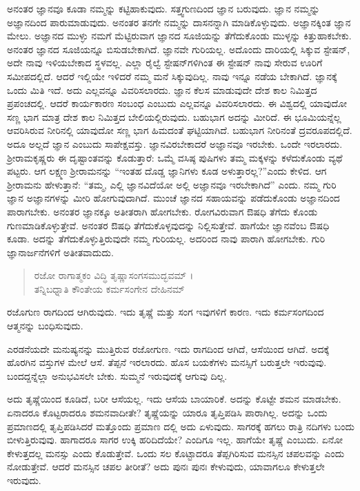 ಅನಂತರ ಜ್ಞಾನವೂ ಕೂಡಾ ನಮ್ಮನ್ನು ಕಟ್ಟಿಹಾಕುವುದು. ಸತ್ತ್ವಗುಣದಿಂದ ಜ್ಞಾನ ಬರುವುದು. ಜ್ಞಾನ ನಮ್ಮನ್ನು ಅಜ್ಞಾನದಿಂದ ಪಾರುಮಾಡುವುದು. ಅನಂತರ ತನಗೇ ನಮ್ಮನ್ನು ದಾಸನನ್ನಾಗಿ ಮಾಡಿಕೊಳ್ಳುವುದು. ಅಜ್ಞಾನಕ್ಕಿಂತ ಜ್ಞಾನ ಮೇಲು. ಅಜ್ಞಾನದ ಮುಳ್ಳು ನಮಗೆ ಮೆಟ್ಟಿರುವಾಗ ಜ್ಞಾನದ ಸೂಜಿಯನ್ನು ತೆಗೆದುಕೊಂಡು ಮುಳ್ಳನ್ನು ಕಿತ್ತುಹಾಕಬೇಕು. ಅನಂತರ ಜ್ಞಾನದ ಸೂಜಿಯನ್ನೂ ಬಿಸುಡಬೇಕಾಗಿದೆ. ಜ್ಞಾನವೇ ಗುರಿಯಲ್ಲ. ಅದೊಂದು ದಾರಿಯಲ್ಲಿ ಸಿಕ್ಕುವ ಸ್ಟೇಷನ್, ಅದೇ ನಾವು ಇಳಿಯಬೇಕಾದ ಸ್ಥಳವಲ್ಲ. ಎಲ್ಲಾ ರೈಲ್ವೆ ಸ್ಟೇಷನ್​ಗಳಿಗಿಂತ ಈ ಸ್ಟೇಷನ್ ನಾವು ಸೇರುವ ಊರಿಗೆ ಸಮೀಪದಲ್ಲಿದೆ. ಆದರೆ ಇಲ್ಲಿಯೇ ಇಳಿದರೆ ನಮ್ಮ ಮನೆ ಸಿಕ್ಕುವುದಿಲ್ಲ. ನಾವು ಇನ್ನೂ ನಡೆಯ ಬೇಕಾಗಿದೆ. ಜ್ಞಾನಕ್ಕೆ ಒಂದು ಮಿತಿ ಇದೆ. ಅದು ಎಲ್ಲವನ್ನೂ ವಿವರಿಸಲಾರದು. ಜ್ಞಾನ ಕೆಲಸ ಮಾಡುವುದೇ ದೇಶ ಕಾಲ ನಿಮಿತ್ತದ ಪ್ರಪಂಚದಲ್ಲಿ. ಆದರೆ ಕಾರ್ಯಕಾರಣ ಸಂಬಂಧ ಎಂಬುದು ಎಲ್ಲವನ್ನೂ ವಿವರಿಸಲಾರದು. ಈ ವಿಶ್ವದಲ್ಲಿ ಯಾವುದೋ ಸಣ್ಣ ಭಾಗ ಮಾತ್ರ ದೇಶ ಕಾಲ ನಿಮಿತ್ತದ ಬೇಲಿಯಲ್ಲಿರುವುದು. ಬಹುಭಾಗ ಅದನ್ನು ಮೀರಿದೆ. ಈ ಭೂಮಿಯನ್ನೆಲ್ಲ ಆವರಿಸಿರುವ ನೀರಿನಲ್ಲಿ ಯಾವುದೋ ಸಣ್ಣ ಭಾಗ ಹಿಮದಂತೆ ಘಟ್ಟಿಯಾಗಿದೆ. ಬಹುಭಾಗ ನೀರಿನಂತೆ ದ್ರವರೂಪದಲ್ಲಿದೆ. ಅದೂ ಅಲ್ಲದೆ ಜ್ಞಾನ ಎಂಬುದು ಸಾಪೇಕ್ಷವಸ್ತು. ಜ್ಞಾನವಿರಬೇಕಾದರೆ ಅಜ್ಞಾನವೂ ಇರಬೇಕು. ಒಂದೇ ಇರಲಾರದು. ಶ್ರೀರಾಮಕೃಷ್ಣರು ಈ ದೃಷ್ಟಾಂತವನ್ನು ಕೊಡುತ್ತಾರೆ: ಒಮ್ಮೆ ವಸಿಷ್ಠ ಪುಷಿಗಳು ತಮ್ಮ ಮಕ್ಕಳನ್ನು ಕಳೆದುಕೊಂಡು ವ್ಯಥೆ ಪಟ್ಟರು. ಆಗ ಲಕ್ಷ್ಮಣ ಶ್ರೀರಾಮನನ್ನು “ಇಂತಹ ದೊಡ್ಡ ಜ್ಞಾನಿಗಳು ಕೂಡ ಅಳುತ್ತಾರಲ್ಲ?”ಎಂದು ಕೇಳಿದ. ಆಗ ಶ್ರೀರಾಮನು ಹೇಳುತ್ತಾನೆ: “ತಮ್ಮ, ಎಲ್ಲಿ ಜ್ಞಾನವಿದೆಯೋ ಅಲ್ಲಿ ಅಜ್ಞಾನವೂ ಇರಬೇಕಾಗಿದೆ” ಎಂದು. ನಮ್ಮ ಗುರಿ ಜ್ಞಾನ ಅಜ್ಞಾನಗಳನ್ನು ಮೀರಿ ಹೋಗುವುದಾಗಿದೆ. ಮುಂಚೆ ಜ್ಞಾನದ ಸಹಾಯವನ್ನು ಪಡೆದುಕೊಂಡು ಅಜ್ಞಾನದಿಂದ ಪಾರಾಗಬೇಕು. ಅನಂತರ ಜ್ಞಾನಕ್ಕೂ ಅತೀತರಾಗಿ ಹೋಗಬೇಕು. ರೋಗವಿರುವಾಗ ಔಷಧಿ ತೆಗೆದು ಕೊಂಡು ಗುಣಮಾಡಿಕೊಳ್ಳುತ್ತೇವೆ. ಅನಂತರ ಔಷಧಿ ತೆಗೆದುಕೊಳ್ಳವುದನ್ನು ನಿಲ್ಲಿಸುತ್ತೇವೆ. ಹಾಗೆಯೇ ಜ್ಞಾನವೆಂಬ ಔಷಧಿ ಕೂಡಾ. ಅದನ್ನು ತೆಗೆದುಕೊಳ್ಳುತ್ತಿರುವುದೇ ನಮ್ಮ ಗುರಿಯಲ್ಲ. ಅದರಿಂದ ನಾವು ಪಾರಾಗಿ ಹೋಗಬೇಕು. ಗುರಿ ಜ್ಞಾನಾರ್ಜನೆಗಳಿಗೆ ಅತೀತವಾದುದು.

\begin{verse}
ರಜೋ ರಾಗಾತ್ಮಕಂ ವಿದ್ಧಿ ತೃಷ್ಣಾಸಂಗಸಮುದ್ಭವಮ್ ।\\ತನ್ನಿಬಧ್ನಾತಿ ಕೌಂತೇಯ ಕರ್ಮಸಂಗೇನ ದೇಹಿನಮ್ 
\end{verse}

{\small ರಜೊಗುಣ ರಾಗದಿಂದ ಆಗಿರುವುದು. ಇದು ತೃಷ್ಣೆ ಮತ್ತು ಸಂಗ ಇವುಗಳಿಗೆ ಕಾರಣ. ಇದು ಕರ್ಮಸಂಗದಿಂದ ಆತ್ಮನನ್ನು ಬಂಧಿಸುವುದು.}

ಎರಡನೆಯದೇ ಮನುಷ್ಯನನ್ನು ಮುತ್ತಿರುವ ರಜೋಗುಣ. ಇದು ರಾಗದಿಂದ ಆಗಿದೆ, ಆಸೆಯಿಂದ ಆಗಿದೆ. ಅದಕ್ಕೆ ಹೊರಗಿನ ವಸ್ತುಗಳ ಮೇಲೆ ಆಸೆ. ತೆಪ್ಪನೆ ಇರಲಾರದು. ಹೊಸ ಬಯಕೆಗಳು ಮನಸ್ಸಿಗೆ ಬರುತ್ತಲೇ ಇರುವುವು. ಬಂದದ್ದನ್ನೆಲ್ಲಾ ಅನುಭವಿಸಲೇ ಬೇಕು. ಸುಮ್ಮನೆ ಇರುವುದಕ್ಕೆ ಆಗುವು ದಿಲ್ಲ.

ಅದು ತೃಷ್ಣೆಯಿಂದ ಕೂಡಿದೆ, ಬರೀ ಆಸೆಯಲ್ಲ. ಇದು ಆಸೆಯ ಬಾಯಾರಿಕೆ. ಅದನ್ನು ಕೊಟ್ಟೇ ಶಮನ ಮಾಡಬೇಕು. ಏನಾದರೂ ಕೊಟ್ಟರಾದರೂ ಶಮನವಾದೀತೇ? ತೃಷ್ಣೆಯನ್ನು ಯಾರೂ ತೃಪ್ತಿಪಡಿಸಿ ಪಾರಾಗಿಲ್ಲ. ಅದನ್ನು ಒಂದು ಪ್ರಮಾಣದಲ್ಲಿ ತೃಪ್ತಿಪಡಿಸಿದರೆ ಮತ್ತೊಂದು ಪ್ರಮಾಣ ದಲ್ಲಿ ಅದು ಏಳುವುದು. ಸಾಗರಕ್ಕೆ ಹಗಲು ರಾತ್ರಿ ನದಿಗಳು ಬಂದು ಬೀಳುತ್ತಿರುವುವು. ಹಾಗಾದರೂ ಸಾಗರ ಉಕ್ಕಿ ಹರಿದಿದೆಯೇ? ಎಂದಿಗೂ ಇಲ್ಲ. ಹಾಗೆಯೇ ತೃಷ್ಣೆ ಎಂಬುದು. ಏನೋ ಕೇಳುತ್ತದಲ್ಲ ಮನಸ್ಸು ಎಂದು ಕೊಡುತ್ತೇವೆ. ಒಂದು ಸಲ ಕೊಟ್ಟಾದರೂ ತೆಪ್ಪಗಿರಿಸುವ ಮನಸ್ಸಿನ ಚಪಲವನ್ನು ಎಂದು ನೋಡುತ್ತೇವೆ. ಆದರೆ ಮನಸ್ಸಿನ ಚಪಲ ತೀರೀತೆ? ಅದು ಪುನಃ ಪುನಃ ಕೇಳುವುದು, ಯಾವಾಗಲೂ ಕೇಳುತ್ತಲೇ ಇರುವುದು.

